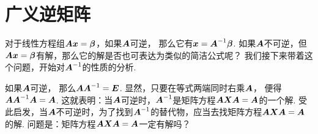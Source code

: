 \section{广义逆矩阵}
对于线性方程组\(\vb{A}\vb{x}=\vb\beta\)，如果\(\vb{A}\)可逆，
那么它有\(\vb{x}=\vb{A}^{-1}\vb\beta\).
如果\(\vb{A}\)不可逆，但\(\vb{A}\vb{x}=\vb\beta\)有解，那么它的解是否也可表达为类似的简洁公式呢？
我们接下来带着这个问题，开始对\(\vb{A}^{-1}\)的性质的分析.

如果\(\vb{A}\)可逆，
那么\(\vb{A}\vb{A}^{-1}=\vb{E}\).
显然，只要在等式两端同时右乘\(\vb{A}\)，
便得\(\vb{A}\vb{A}^{-1}\vb{A}=\vb{A}\).
这就表明：当\(\vb{A}\)可逆时，\(\vb{A}^{-1}\)是矩阵方程\(\vb{A} \vb{X} \vb{A} = \vb{A}\)的一个解.
受此启发，当\(\vb{A}\)不可逆时，为了找到\(\vb{A}^{-1}\)的替代物，应当去找矩阵方程\(\vb{A} \vb{X} \vb{A} = \vb{A}\)的解.
问题是：矩阵方程\(\vb{A} \vb{X} \vb{A} = \vb{A}\)一定有解吗？

